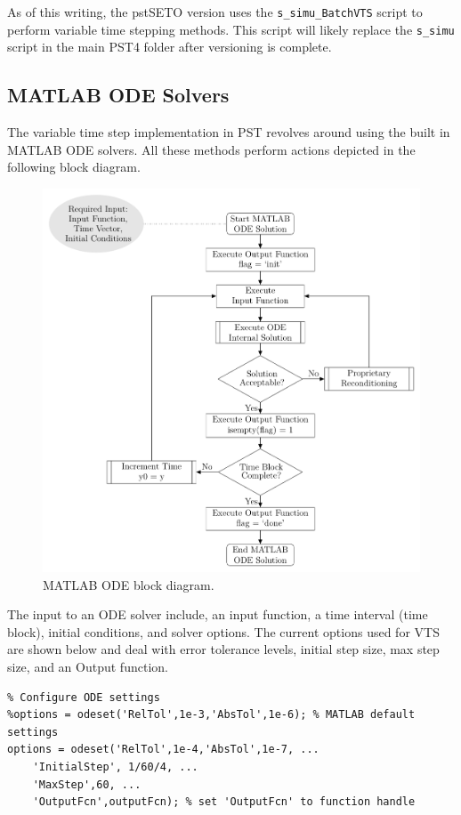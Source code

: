 As of this writing, the pstSETO version uses the \verb|s_simu_BatchVTS| script to perform variable time stepping methods.
This script will likely replace the \verb|s_simu| script in the main PST4 folder after versioning is complete.\\

\subsection{MATLAB ODE Solvers}
The variable time step implementation in PST revolves around using the built in MATLAB ODE solvers.
All these methods perform actions depicted in the following block diagram.

\begin{figure}[!h]
	\centering
	\footnotesize
	\includegraphics[width=.8\linewidth]{./../../one-offs/200804-ODEblockDiagram/200804-ODEblockDiagram}
	\caption{MATLAB ODE block diagram.}
	\label{fig: MATLAB ode block diagram}
\end{figure}%

The input to an ODE solver include, an input function, a time interval (time block), initial conditions, and solver options.
The current options used for VTS are shown below and deal with error tolerance levels, initial step size, max step size, and an Output function.

\begin{verbatim}
% Configure ODE settings
%options = odeset('RelTol',1e-3,'AbsTol',1e-6); % MATLAB default settings
options = odeset('RelTol',1e-4,'AbsTol',1e-7, ...
    'InitialStep', 1/60/4, ...
    'MaxStep',60, ...
    'OutputFcn',outputFcn); % set 'OutputFcn' to function handle
\end{verbatim}

